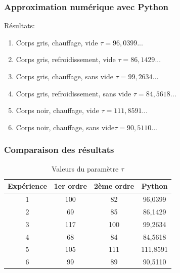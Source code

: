 \documentclass{beamer}
\begin{document}
\begin{frame}
\frametitle{Approximation numérique avec Python}
Résultats:
\begin{enumerate}
	\item{{\color{gray7}Corps gris}{\color{gray4}, {\color{red}chauffage}, vide} \hfill $\tau = 96,0399...$\hspace{4em} \newline}
	\item{{\color{gray7}Corps gris}{\color{gray4}, {\color{blue5}refroidissement}, vide} \hfill $\tau = 86,1429...$\hspace{4em} \newline}
	\item{{\color{gray7}Corps gris}{\color{gray4}, {\color{red}chauffage}, sans vide} \hfill $\tau = 99,2634...$\hspace{4em} \newline}
	\item{{\color{gray7}Corps gris}{\color{gray4}, {\color{blue5}refroidissement}, sans vide} \hfill $\tau = 84,5618...$\hspace{4em} \newline}
	\item{{\color{black}Corps noir}{\color{gray4}, {\color{red}chauffage}, vide} \hfill $\tau = 111,8591...$\hspace{4em} \newline}
	\item{{\color{black}Corps noir}{\color{gray4}, {\color{red}chauffage}, sans vide}\hfill $\tau = 90,5110...$\hspace{4em} \newline}
\end{enumerate}
\end{frame}





\begin{frame}
\frametitle{Comparaison des résultats}

\begin{table}[htdp]
\begin{center}\begin{tabular}{|c|c|c|c|}
\hline
Expérience & 1er ordre & 2ème ordre & Python \\
\hline
1 & 100 & 82 & 96,0399 \\
2 & 69 & 85 & 86,1429 \\
3 & 117 & 100 & 99,2634 \\
4 & 68 & 84 & 84,5618 \\
5 & 105 & 111 & 111,8591 \\
6 & 99 & 89 & 90,5110 \\
\hline
\end{tabular} 
\caption{Valeurs du paramètre $\tau$}
\end{center}
\label{defaulttable}
\end{table}

\end{frame}
\end{document}
